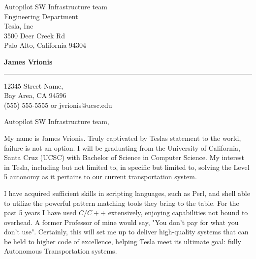\documentclass{letter}  %
\begin{document}
\signature{James Vrionis}    %
\longindentation=0pt         %
\let\raggedleft\raggedright  %
 
\begin{letter}{
Autopilot SW Infrastructure team \\
Engineering Department\\
Tesla, Inc \\
3500 Deer Creek Rd \\
Palo Alto, California 94304 
}

\begin{center}
   {\large\bf James Vrionis} 
\end{center}
\medskip\hrule height 1pt
\begin{center}
   {12345  Street Name, \\  Bay Area, CA 94596 \\ 
   (555) 555-5555 or jvrionis@ucsc.edu }
\end{center} \vfill %
 
\opening{Autopilot SW Infrastructure team,}

\noindent My name is James Vrionis. Truly captivated by Teslas 
statement to the world, failure is not an option. I will be graduating 
from the University of California, Santa Cruz (UCSC) with Bachelor of 
Science in Computer Science. My interest in Tesla, including but not 
limited to, in specific but limited to, solving the Level 5 autonomy 
as it pertains to our current transportation system.

\noindent I have acquired sufficient skills in scripting languages, 
such as Perl, and shell able to utilize the powerful pattern 
matching tools they bring to the table. For the past 5 years 
I have used $C/C++$ extensively, enjoying capabilities not 
bound to overhead. A former Professor of mine would say, 
"You don't pay for what you don't use". Certainly, this will 
set me up to deliver high-quality systems that can be held to 
higher code of excellence, helping Tesla meet its ultimate goal: 
fully Autonomous Transportation systems.


\end{letter}
\end{document}
